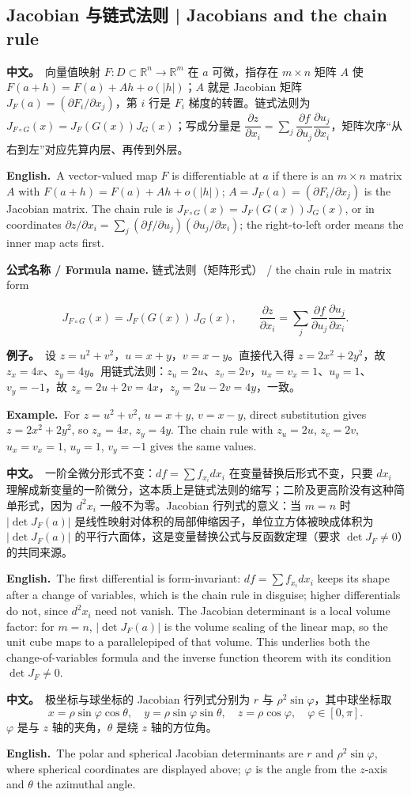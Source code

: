 \documentclass[UTF8,11pt,a4paper]{ctexart}
\newcommand{\BOTH}[2]{\par\noindent\textbf{中文。}\ #1\par\noindent\textbf{English.}\ #2\par}
\newcommand{\EX}[2]{\par\noindent\textbf{例子。}\ #1\par\noindent\textbf{Example.}\ #2\par}
\newcommand{\FORMULA}[2]{\par\noindent\textbf{公式名称 / Formula name.} #1 / #2\par}
\begin{document}
\subsection{Jacobian 与链式法则 | Jacobians and the chain rule}
\BOTH{向量值映射 $F:D\subset\mathbb R^n\to\mathbb R^m$ 在 $a$ 可微，指存在 $m\times n$ 矩阵 $A$ 使 $F(a+h)=F(a)+Ah+o(|h|)$；$A$ 就是 Jacobian 矩阵 $J_F(a)=(\partial F_i/\partial x_j)$，第 $i$ 行是 $F_i$ 梯度的转置。链式法则为 $J_{F\circ G}(x)=J_F(G(x))J_G(x)$；写成分量是 $\dfrac{\partial z}{\partial x_i}=\sum_j\dfrac{\partial f}{\partial u_j}\dfrac{\partial u_j}{\partial x_i}$，矩阵次序“从右到左”对应先算内层、再传到外层。}{A vector-valued map $F$ is differentiable at $a$ if there is an $m\times n$ matrix $A$ with $F(a+h)=F(a)+Ah+o(|h|)$; $A=J_F(a)=(\partial F_i/\partial x_j)$ is the Jacobian matrix. The chain rule is $J_{F\circ G}(x)=J_F(G(x))J_G(x)$, or in coordinates $\partial z/\partial x_i=\sum_j(\partial f/\partial u_j)(\partial u_j/\partial x_i)$; the right-to-left order means the inner map acts first.}
\FORMULA{链式法则（矩阵形式）}{the chain rule in matrix form}
\[
J_{F\circ G}(x)=J_F(G(x))\,J_G(x),\qquad \frac{\partial z}{\partial x_i}=\sum_{j}\frac{\partial f}{\partial u_j}\frac{\partial u_j}{\partial x_i}.
\]
\EX{设 $z=u^2+v^2$，$u=x+y$，$v=x-y$。直接代入得 $z=2x^2+2y^2$，故 $z_x=4x$、$z_y=4y$。用链式法则：$z_u=2u$、$z_v=2v$，$u_x=v_x=1$、$u_y=1$、$v_y=-1$，故 $z_x=2u+2v=4x$，$z_y=2u-2v=4y$，一致。}{For $z=u^2+v^2$, $u=x+y$, $v=x-y$, direct substitution gives $z=2x^2+2y^2$, so $z_x=4x$, $z_y=4y$. The chain rule with $z_u=2u$, $z_v=2v$, $u_x=v_x=1$, $u_y=1$, $v_y=-1$ gives the same values.}
\BOTH{一阶全微分形式不变：$df=\sum f_{x_i}dx_i$ 在变量替换后形式不变，只要 $dx_i$ 理解成新变量的一阶微分，这本质上是链式法则的缩写；二阶及更高阶没有这种简单形式，因为 $d^2x_i$ 一般不为零。Jacobian 行列式的意义：当 $m=n$ 时 $|\det J_F(a)|$ 是线性映射对体积的局部伸缩因子，单位立方体被映成体积为 $|\det J_F(a)|$ 的平行六面体，这是变量替换公式与反函数定理（要求 $\det J_F\ne0$）的共同来源。}{The first differential is form-invariant: $df=\sum f_{x_i}dx_i$ keeps its shape after a change of variables, which is the chain rule in disguise; higher differentials do not, since $d^2x_i$ need not vanish. The Jacobian determinant is a local volume factor: for $m=n$, $|\det J_F(a)|$ is the volume scaling of the linear map, so the unit cube maps to a parallelepiped of that volume. This underlies both the change-of-variables formula and the inverse function theorem with its condition $\det J_F\ne0$.}
\BOTH{极坐标与球坐标的 Jacobian 行列式分别为 $r$ 与 $\rho^2\sin\varphi$，其中球坐标取
\[
x=\rho\sin\varphi\cos\theta,\quad y=\rho\sin\varphi\sin\theta,\quad z=\rho\cos\varphi,\quad \varphi\in[0,\pi].
\]
$\varphi$ 是与 $z$ 轴的夹角，$\theta$ 是绕 $z$ 轴的方位角。}{The polar and spherical Jacobian determinants are $r$ and $\rho^2\sin\varphi$, where spherical coordinates are displayed above; $\varphi$ is the angle from the $z$-axis and $\theta$ the azimuthal angle.}
\end{document}
